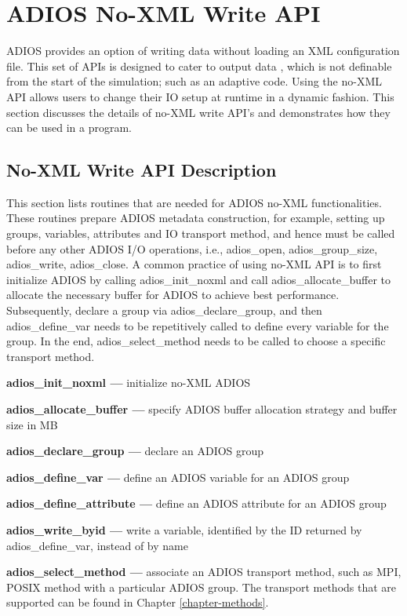 \chapter{ADIOS No-XML Write API }

ADIOS provides an option of writing data without loading an XML configuration file. 
This set of APIs is designed to cater to output data , which is not definable from 
the start of the simulation; such as an adaptive code. Using the no-XML API allows 
users to change their IO setup at runtime in a dynamic fashion.  This section discusses 
the details of no-XML write API's and demonstrates how they can be used in a program. 

\section{No-XML Write API Description}

This section lists routines that are needed for ADIOS no-XML functionalities. These 
routines prepare ADIOS metadata construction, for example, setting up groups, variables, 
attributes and IO transport method, and hence must be called before any other ADIOS 
I/O operations, i.e., adios\_open, adios\_group\_size, adios\_write, adios\_close. 
A common practice of using no-XML API is to first initialize ADIOS by calling 
adios\_init\_noxml 
and call adios\_allocate\_buffer to allocate the necessary buffer for ADIOS to achieve 
best performance. Subsequently, declare a group via adios\_declare\_group, and then 
adios\_define\_var needs to be repetitively called to define every variable 
for the group.  In the end, adios\_select\_method needs to be called to choose 
a specific transport method.

\textbf{adios\_init\_noxml ---} initialize no-XML ADIOS

\textbf{adios\_allocate\_buffer ---} specify ADIOS buffer allocation strategy and 
buffer size in MB

\textbf{adios\_declare\_group ---} declare an ADIOS group 

\textbf{adios\_define\_var ---} define an ADIOS variable for an ADIOS group

\textbf{adios\_define\_attribute ---} define an ADIOS attribute for an ADIOS group

\textbf{adios\_write\_byid ---} write a variable, identified by the ID returned by adios\_define\_var, instead of by name

\textbf{adios\_select\_method ---} associate an ADIOS transport method, such as MPI, 
POSIX method with a particular ADIOS group. The transport methods that are supported 
can be found in Chapter \ref{chapter-methods}.

